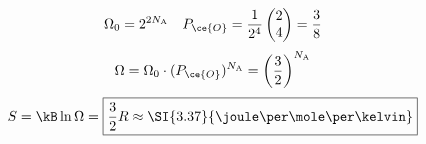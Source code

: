 \documentclass{ctexbook}
\begin{document}
\[\Omega_0=2^{2N_{\text{A}}}\quad P_{\ce{O}}=\dfrac{1}{2^4}\begin{pmatrix}
    2\\4
\end{pmatrix}=\dfrac{3}{8}\]
\[\Omega=\Omega_0\cdot(P_{\ce{O}})^{N_{\text{A}}}=\left(\dfrac{3}{2}\right)^{N_{\text{A}}}\]
\[S=\kB\ln\Omega=\boxed{\dfrac32R\approx\SI{3.37}{\joule\per\mole\per\kelvin}}\]
\end{document}
